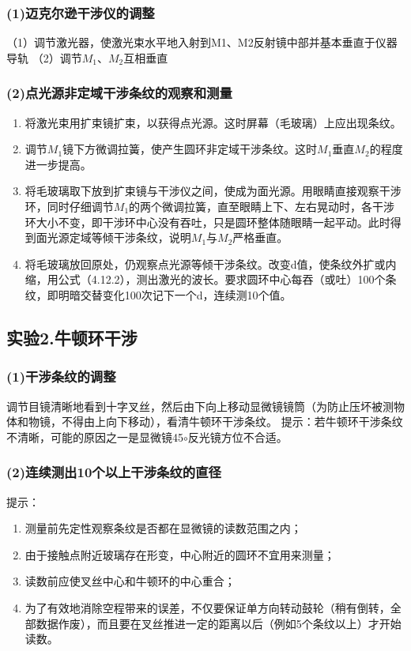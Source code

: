 \documentclass[11pt,a4paper,oneside]{article}
\begin{document}
\subsubsection*{(1)迈克尔逊干涉仪的调整}
（1）调节激光器，使激光束水平地入射到M1、M2反射镜中部并基本垂直于仪器导轨
（2）调节$M_1$、$M_2$互相垂直

\subsubsection*{(2)点光源非定域干涉条纹的观察和测量}
\begin{enumerate}
	\item 将激光束用扩束镜扩束，以获得点光源。这时屏幕（毛玻璃）上应出现条纹。
	\item 调节$M_1$镜下方微调拉簧，使产生圆环非定域干涉条纹。这时$M_1$垂直$M_2$的程度进一步提高。
	\item 将毛玻璃取下放到扩束镜与干涉仪之间，使成为面光源。用眼睛直接观察干涉环，同时仔细调节$M_1$的两个微调拉簧，直至眼睛上下、左右晃动时，各干涉环大小不变，即干涉环中心没有吞吐，只是圆环整体随眼睛一起平动。此时得到面光源定域等倾干涉条纹，说明$M_1$与$M_2$严格垂直。
	\item 将毛玻璃放回原处，仍观察点光源等倾干涉条纹。改变d值，使条纹外扩或内缩，用公式（4.12.2），测出激光的波长。要求圆环中心每吞（或吐）100个条纹，即明暗交替变化100次记下一个d，连续测10个值。
\end{enumerate}

\subsection*{实验2.牛顿环干涉}
\subsubsection*{(1)干涉条纹的调整}
调节目镜清晰地看到十字叉丝，然后由下向上移动显微镜镜筒（为防止压坏被测物体和物镜，不得由上向下移动），看清牛顿环干涉条纹。
提示：若牛顿环干涉条纹不清晰，可能的原因之一是显微镜45$\circ$反光镜方位不合适。

\subsubsection*{(2)连续测出10个以上干涉条纹的直径}
提示：
\begin{enumerate}
	\item 测量前先定性观察条纹是否都在显微镜的读数范围之内；
	\item 由于接触点附近玻璃存在形变，中心附近的圆环不宜用来测量；
	\item 读数前应使叉丝中心和牛顿环的中心重合；
	\item 为了有效地消除空程带来的误差，不仅要保证单方向转动鼓轮（稍有倒转，全部数据作废），而且要在叉丝推进一定的距离以后（例如5个条纹以上）才开始读数。
\end{enumerate}
\end{document}
